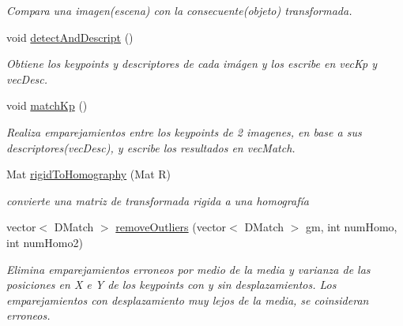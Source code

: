 \begin{DoxyCompactItemize}
\begin{DoxyCompactList}\small\item\em Compara una imagen(escena) con la consecuente(objeto) transformada. \end{DoxyCompactList}\item 
\mbox{\label{classuav_1_1Stitcher_aa2e06db82b2e702285a1cc335aef9bfe}} 
void \mbox{\hyperlink{classuav_1_1Stitcher_aa2e06db82b2e702285a1cc335aef9bfe}{detect\+And\+Descript}} ()
\begin{DoxyCompactList}\small\item\em Obtiene los keypoints y descriptores de cada imágen y los escribe en vec\+Kp y vec\+Desc. \end{DoxyCompactList}\item 
\mbox{\label{classuav_1_1Stitcher_a4f2f80e5505962c031d2b788c621c8fd}} 
void \mbox{\hyperlink{classuav_1_1Stitcher_a4f2f80e5505962c031d2b788c621c8fd}{match\+Kp}} ()
\begin{DoxyCompactList}\small\item\em Realiza emparejamientos entre los keypoints de 2 imagenes, en base a sus descriptores(vec\+Desc), y escribe los resultados en vec\+Match. \end{DoxyCompactList}\item 
\mbox{\label{classuav_1_1Stitcher_a1d9236693b18d722cb5329c5edc29ea9}} 
Mat \mbox{\hyperlink{classuav_1_1Stitcher_a1d9236693b18d722cb5329c5edc29ea9}{rigid\+To\+Homography}} (Mat R)
\begin{DoxyCompactList}\small\item\em convierte una matriz de transformada rigida a una homografía \end{DoxyCompactList}\item 
\mbox{\label{classuav_1_1Stitcher_a1dfaf5c6e14e6234bfca0d8997bc0fc5}} 
vector$<$ D\+Match $>$ \mbox{\hyperlink{classuav_1_1Stitcher_a1dfaf5c6e14e6234bfca0d8997bc0fc5}{remove\+Outliers}} (vector$<$ D\+Match $>$ gm, int num\+Homo, int num\+Homo2)
\begin{DoxyCompactList}\small\item\em Elimina emparejamientos erroneos por medio de la media y varianza de las posiciones en X e Y de los keypoints con y sin desplazamientos. Los emparejamientos con desplazamiento muy lejos de la media, se coinsideran erroneos. \end{DoxyCompactList}\item 

\end{DoxyCompactItemize}

